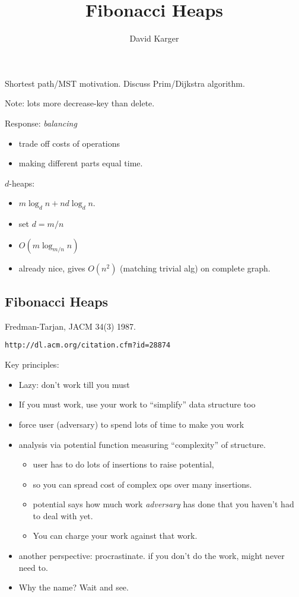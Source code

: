 \documentclass{article}
\title{Fibonacci Heaps}
\author{David Karger}
\begin{document}

Shortest path/MST motivation.  Discuss Prim/Dijkstra algorithm.

Note: lots more decrease-key than delete.

Response: \emph{balancing} 
\begin{itemize}
\item trade off costs of operations
\item making different parts equal time.
\end{itemize}

$d$-heaps:
\begin{itemize}
\item  $m\log_d n + nd\log_d n$. 
\item set $d=m/n$
\item $O(m\log_{m/n} n)$
\item already nice, gives $O(n^2)$ (matching trivial alg) on complete graph.
\end{itemize}

\subsection{Fibonacci Heaps}

Fredman-Tarjan, JACM 34(3) 1987. 

{\tt  http://dl.acm.org/citation.cfm?id=28874} 

Key principles:
\begin{itemize}
\item Lazy: don't work till you must
\item If you must work, use your work to ``simplify''
  data structure too
\item force user (adversary) to spend lots of time to make you work
\item analysis via potential function measuring ``complexity'' of
  structure.  
\begin{itemize}
\item user has to do lots of insertions to raise potential, 
\item so you can spread cost of complex ops over many insertions.  
\item potential says how much work \emph{adversary} has done that you
  haven't had to deal with yet.  
\item You can charge your work against that work.
\end{itemize}
\item another perspective: procrastinate.  if you don't do the work,
  might never need to.
\item Why the name?  Wait and see.
\end{itemize}
\end{document}
